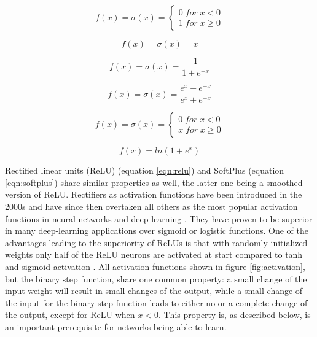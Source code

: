 \begin{equation}
 f(x)= \sigma(x) = \left\{
 \begin{array}{ll}
 0 \; for \; x < 0 \\ 
 1 \; for \; x \geq 0
 \end{array}
\right .
\label{eqn:binary}
\end{equation}

\begin{equation}
 f(x) = \sigma(x) = x
 \label{eqn:ident}
\end{equation}
    
\begin{equation}
 f(x) = \sigma(x) = \frac{1}{1+e^{-x}} 
 \label{eqn:sigmoid}
\end{equation}

\begin{equation}
 f(x) = \sigma(x) = \frac{e^x - e^{-x}}{e^x + e^{-x}}
 \label{eqn:tanh}
\end{equation}

\begin{equation}
 f(x)= \sigma(x) = \left\{
 \begin{array}{ll}
 0 \; for \; x < 0 \\ 
 x \; for \; x \geq 0
 \end{array}
\right .
\label{eqn:relu}
\end{equation}

\begin{equation}
 f(x) = ln(1+e^x)
 \label{eqn:softplus}
\end{equation}


Rectified linear units (ReLU) (equation \ref{eqn:relu}) and SoftPlus (equation \ref{eqn:softplus}) share
similar properties as well, the latter one being a smoothed version of ReLU. Rectifiers as
activation functions have been introduced in the 2000s \cite{hahnloser2000digital} and
have since then overtaken all others as the most popular activation functions in neural
networks and deep learning \cite{lecun2015deep}. They have proven to be superior in many
deep-learning applications over sigmoid or logistic functions. One of the advantages
leading to the superiority of ReLUs is that with randomly initialized weights only half of
the ReLU neurons are activated at start compared to tanh and sigmoid activation
\cite{glorot2011deep}. All activation functions shown in figure \ref{fig:activation}, but
the binary step function, share one common property: a small change of the input weight
will result in small changes of the output, while a small change of the input for the
binary step function leads to either no or a complete change of the output, except for
ReLU when
$x<0$. This property is, as described below, is an important prerequisite for networks being able to learn. \\

